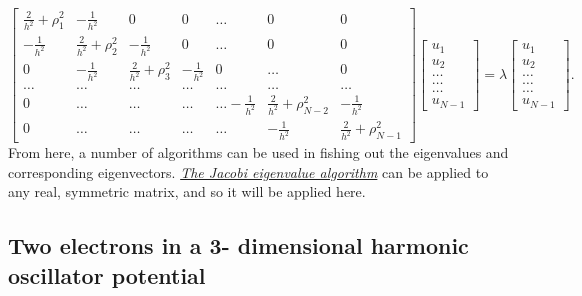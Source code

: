 \documentclass[10pt,a4paper]{article}
\begin{document}
\begin{equation*}
    \begin{bmatrix}\frac{2}{h^2}+\rho_1^2 & -\frac{1}{h^2} & 0   & 0    & \dots  &0     & 0 \\
                                -\frac{1}{h^2} & \frac{2}{h^2}+\rho_2^2 & -\frac{1}{h^2} & 0    & \dots  &0     &0 \\
                                0   & -\frac{1}{h^2} & \frac{2}{h^2}+\rho_3^2 & -\frac{1}{h^2}  &0       &\dots & 0\\
                                \dots  & \dots & \dots & \dots  &\dots      &\dots & \dots\\
                                0   & \dots & \dots & \dots  &\dots  -\frac{1}{h^2}     &\frac{2}{h^2}+\rho_{N-2}^2 & -\frac{1}{h^2}\\
                                0   & \dots & \dots & \dots  &\dots       &-\frac{1}{h^2} & \frac{2}{h^2}+\rho_{N-1}^2
             \end{bmatrix}  \begin{bmatrix} u_{1} \\
                                                              u_{2} \\
                                                              \dots\\ \dots\\ \dots\\
                                                              u_{N-1}
             \end{bmatrix}=\lambda \begin{bmatrix} u_{1} \\
                                                              u_{2} \\
                                                              \dots\\ \dots\\ \dots\\
                                                              u_{N-1}
             \end{bmatrix}.  
      \label{eq:sematrix}
\end{equation*}
From here, a number of algorithms can be used in fishing out the eigenvalues and corresponding eigenvectors. \hyperref[jacobi algo]{\emph{The Jacobi eigenvalue algorithm}} can be applied to any real, symmetric matrix, and so it will be applied here.
\subsection{Two electrons in a 3- dimensional harmonic oscillator potential}
\end{document}
